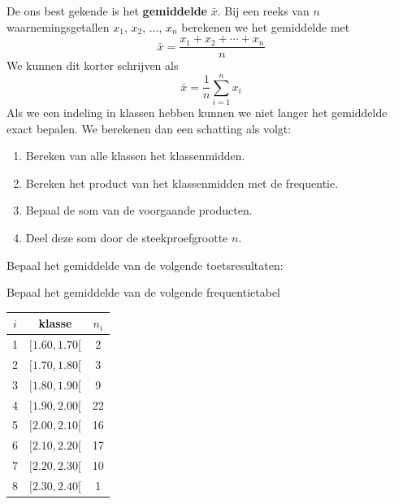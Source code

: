 \documentclass[12pt,twoside,a4paper]{article}
\begin{document}
De ons best gekende is het {\bf gemiddelde} $\bar{x}$. Bij een reeks van $n$ waarnemingsgetallen $x_1$, $x_2$, $\ldots$, $x_n$ berekenen we het gemiddelde met
$$\bar{x}=\dfrac{x_1 + x_2 + \cdots + x_n}{n}$$
We kunnen dit korter schrijven als
$$\bar{x}=\dfrac{1}{n}\sum^n_{i=1}x_i$$
Als we een indeling in klassen hebben kunnen we niet langer het gemiddelde exact bepalen. We berekenen dan een schatting als volgt:
\begin{enumerate}
  \item Bereken van alle klassen het klassenmidden.
  \item Bereken het product van het klassenmidden met de frequentie.
  \item Bepaal de som van de voorgaande producten.
  \item Deel deze som door de steekproefgrootte $n$.
\end{enumerate}

\begin{oefening}
Bepaal het gemiddelde van de volgende toetsresultaten:
\begin{center}
\end{center}
\end{oefening}

\begin{oefening}
Bepaal het gemiddelde van de volgende frequentietabel
\begin{center}
\begin{tabular}{c|c|c}
$i$ & klasse     & $n_i$\\
\hline
  1 & $[ 1.60,  1.70[$ &   2\\
  2 & $[ 1.70,  1.80[$ &   3\\
  3 & $[ 1.80,  1.90[$ &   9\\
  4 & $[ 1.90,  2.00[$ &   22\\
  5 & $[ 2.00,  2.10[$ &   16\\
  6 & $[ 2.10,  2.20[$ &   17\\
  7 & $[ 2.20,  2.30[$ &   10\\
  8 & $[ 2.30,  2.40[$ &   1\\
\end{tabular}
\end{center}
\end{oefening}
\end{document}
